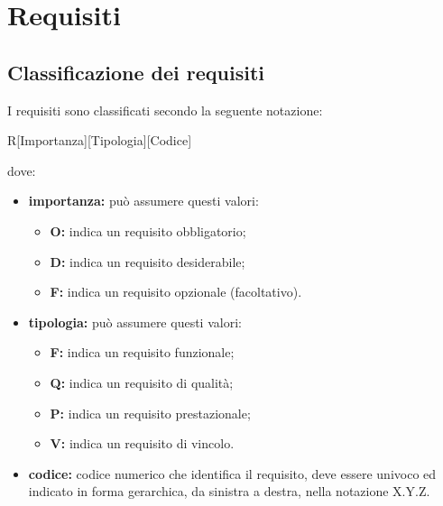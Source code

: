 \section{Requisiti}
\subsection{Classificazione dei requisiti}
I requisiti sono classificati secondo la seguente notazione:
\begin{center}
	R[Importanza][Tipologia][Codice]
\end{center}
dove:
\begin{itemize}
	\item \textbf{importanza:} può assumere questi valori:
	\begin{itemize}
		\item \textbf{O:} indica un requisito obbligatorio;
		\item \textbf{D:} indica un requisito desiderabile;
		\item \textbf{F:} indica un requisito opzionale (facoltativo).
	\end{itemize}
	\item \textbf{tipologia:} può assumere questi valori:
	\begin{itemize}
		\item \textbf{F:} indica un requisito funzionale;
		\item \textbf{Q:} indica un requisito di qualità;
		\item \textbf{P:} indica un requisito prestazionale;
		\item \textbf{V:} indica un requisito di vincolo.
	\end{itemize}
	\item \textbf{codice:} codice numerico che identifica il requisito, deve essere univoco ed indicato in forma gerarchica, da sinistra a destra, nella notazione X.Y.Z.
\end{itemize}
